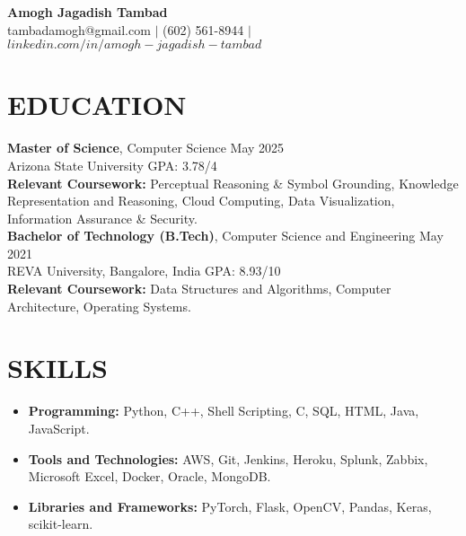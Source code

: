\documentclass[a4paper,9pt]{extarticle}
\begin{document}
\pagestyle{empty}

\begin{center}
\textbf{\huge Amogh Jagadish Tambad}\\[2pt] %
tambadamogh@gmail.com \hspace{1mm} $|$ \hspace{1mm} (602) 561-8944  \hspace{1mm} $|$ \hspace{1mm} $linkedin.com/in/amogh-jagadish-tambad$ \hspace{1mm}
\end{center}

\section*{EDUCATION}
\noindent
\textbf{Master of Science}, Computer Science \hfill May 2025 \\ %
Arizona State University
\hfill GPA: 3.78/4\\ %
\textbf{Relevant Coursework:} Perceptual Reasoning \& Symbol Grounding, Knowledge Representation and Reasoning, Cloud Computing, Data Visualization, Information Assurance \& Security.\\

\noindent
\textbf{Bachelor of Technology (B.Tech)}, Computer Science and Engineering \hfill May 2021 \\ %
REVA University, Bangalore, India \hfill GPA: 8.93/10\\ %
\textbf{Relevant Coursework:} Data Structures and Algorithms, Computer Architecture, Operating Systems.

\section*{SKILLS}
\begin{itemize}
    \item \textbf{Programming:} Python, C++, Shell Scripting, C, SQL, HTML, Java, JavaScript. %
    \item \textbf{Tools and Technologies:} AWS, Git, Jenkins, Heroku, Splunk, Zabbix, Microsoft Excel, Docker, Oracle, MongoDB. %
    \item \textbf{Libraries and Frameworks:} PyTorch, Flask, OpenCV, Pandas, Keras, scikit-learn.
\end{itemize}
\end{document}
